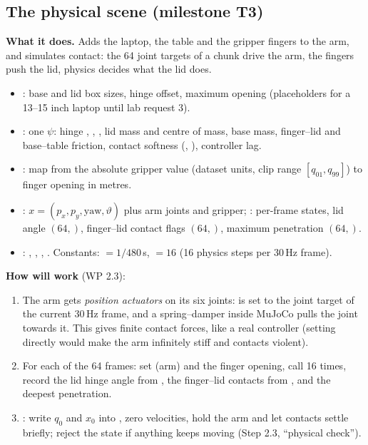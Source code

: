 \subsection{The physical scene (milestone T3) \skel}\label{twin:sec:scene}
\textbf{What it does.} Adds the laptop, the table and the gripper fingers to the arm, and simulates contact: the 64 joint targets of a chunk drive the arm, the fingers push the lid, physics decides what the lid does.

\begin{incode}
\begin{itemize}[leftmargin=*]
\item {}: base and lid box sizes, hinge offset, maximum opening (placeholders for a 13--15 inch laptop until lab request 3).
\item {}: one $\psi$: hinge , , , lid mass and centre of mass, base mass, finger--lid and base--table friction, contact softness (, ), controller lag.
\item {}: map from the absolute gripper value (dataset units, clip range $[q_{01},q_{99}]$) to finger opening in metres.
\item {}: $x=(p_x,p_y,\text{yaw},\vartheta)$ plus arm joints and gripper; : per-frame states, lid angle $(64,)$, finger--lid contact flags $(64,)$, maximum penetration $(64,)$.
\item {}: , , , . Constants:  $=1/480$\,s,  $=16$ (16 physics steps per 30\,Hz frame).
\end{itemize}
\end{incode}

\textbf{How  will work} \planned{} (WP 2.3):
\begin{enumerate}
\item The arm gets \emph{position actuators} on its six joints:  is set to the joint target of the current 30\,Hz frame, and a spring--damper inside MuJoCo pulls the joint towards it. This gives finite contact forces, like a real controller (setting  directly would make the arm infinitely stiff and contacts violent).
\item For each of the 64 frames: set  (arm) and the finger opening, call  16 times, record the lid hinge angle from , the finger--lid contacts from , and the deepest penetration.
\item {}: write $q_0$ and $x_0$ into , zero velocities, hold the arm and let contacts settle briefly; reject the state if anything keeps moving (Step 2.3, ``physical check'').
\end{enumerate}


